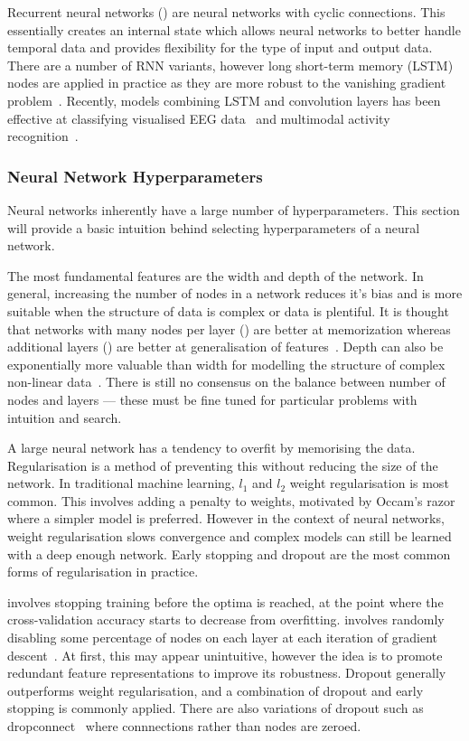 \documentclass[12pt, twoside]{book}
\renewcommand\emph[1]{\textit{\color{USred}{#1}}}
\begin{document}
Recurrent neural networks (\emph{RNNs}) are neural networks with cyclic connections. This essentially creates an internal state which allows neural networks to better handle temporal data and provides flexibility for the type of input and output data. There are a number of RNN variants, however long short-term memory (LSTM) nodes are applied in practice as they are more robust to the vanishing gradient problem~\cite{lstm}. Recently, models combining LSTM and convolution layers has been effective at classifying visualised EEG data~\cite{bashivan2015learning} and multimodal activity recognition~\cite{deepconvlstm}.


\subsubsection{Neural Network Hyperparameters}
Neural networks inherently have a large number of hyperparameters. This section will provide a basic intuition behind selecting hyperparameters of a neural network. 

The most fundamental features are the width and depth of the network. In general, increasing the number of nodes in a network reduces it's bias and is more suitable when the structure of data is complex or data is plentiful. It is thought that networks with many nodes per layer (\emph{width}) are better at memorization whereas additional layers (\emph{depth}) are better at generalisation of features~\cite{cheng2016wide}. Depth can also be exponentially more valuable than width for modelling the structure of complex non-linear data~\cite{eldan2016power}. There is still no consensus on the balance between number of nodes and layers --- these must be fine tuned for particular problems with intuition and search.

A large neural network has a tendency to overfit by memorising the data. Regularisation is a method of preventing this without reducing the size of the network. In traditional machine learning, $l_1$ and $l_2$ weight regularisation is most common. This involves adding a penalty to weights, motivated by Occam's razor where a simpler model is preferred. However in the context of neural networks, weight regularisation slows convergence and complex models can still be learned with a deep enough network. {Early stopping} and {dropout} are the most common forms of regularisation in practice. 

\emph{Early stopping} involves stopping training before the optima is reached, at the point where the cross-validation accuracy starts to decrease from overfitting. \emph{Dropout} involves randomly disabling some percentage of nodes on each layer at each iteration of gradient descent~\cite{dropout}. At first, this may appear unintuitive, however the idea is to promote redundant feature representations to improve its robustness. Dropout generally outperforms weight regularisation, and a combination of dropout and early stopping is commonly applied. There are also variations of dropout such as dropconnect~\cite{dropconnect} where connnections rather than nodes are zeroed.
\end{document}
